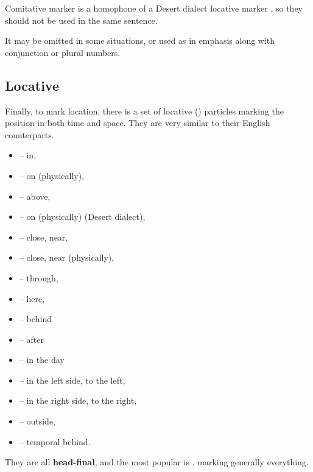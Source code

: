 Comitative marker is a homophone of a Desert dialect locative marker ,
so they should not be used in the same sentence.

It may be omitted in some situations, or used as in emphasis along with
conjunction or plural numbers.




\subsection{Locative}

Finally, to mark location, there is a set of locative (\Loc{}) particles marking
the position in both time and space. They are very similar to their English
counterparts.

\begin{itemize}
    \item {} -- in,
    \item {} -- on (physically),
    \item {} -- above,
    \item {} -- on (physically) (Desert dialect),
    \item {} -- close, near,
    \item {} -- close, near (physically),
    \item {} -- through,
    \item {} -- here,
    \item {} -- behind
    \item {} -- after
    \item {} -- in the day
    \item {} -- in the left side, to the left,
    \item {} -- in the right side, to the right,
    \item {} -- outside,
    \item {} -- temporal behind.
\end{itemize}

They are all \textbf{head-final}, and the most popular is , marking
generally everything.


